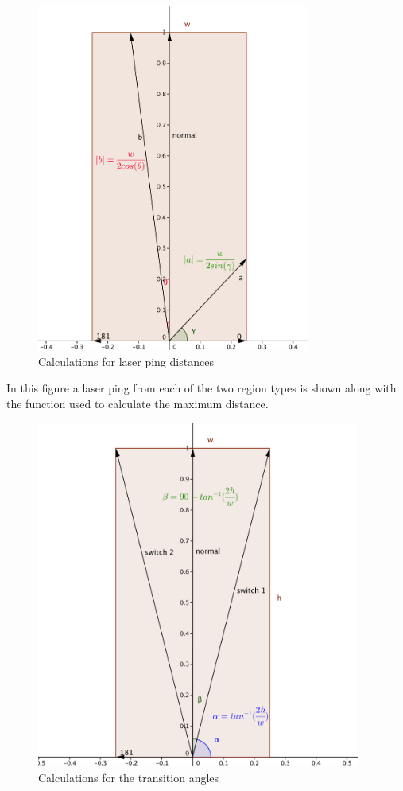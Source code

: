 \FloatBarrier
\begin{figure}[h]
  \centering
  \includegraphics[height=4.5in]{Look_Ahead_Bounding_Box.png}
  \caption{Calculations for laser ping distances}
  \label{fig:lookAheadLaserPingDistances}
\end{figure}
\FloatBarrier

In this figure a laser ping from each of the two region types is shown
along with the function used to calculate the maximum distance.

\FloatBarrier
\begin{figure}[h]
  \centering
  \includegraphics[height=4.5in]{look_ahead_bounding_box_transitions.png}
  \caption{Calculations for the transition angles}
\end{figure}
\FloatBarrier

